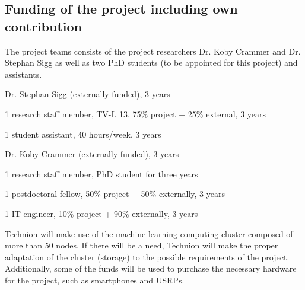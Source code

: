 \documentclass[12pt]{article}
\newcommand{\nolineskips}{
	\setlength{\parskip}{0pt}
	\setlength{\parsep}{0pt}
	\setlength{\topsep}{0pt}
	\setlength{\partopsep}{0pt}
	\setlength{\itemsep}{0pt}}
\begin{document}
\subsection*{Funding of the project including own contribution}
The project teams consists of the project researchers Dr. Koby Crammer and Dr. Stephan Sigg as well as two PhD students (to be appointed for this project) and assistants.
\begin{description}
	\nolineskips
	\item[UGOE] Dr. Stephan Sigg (externally funded), 3 years
	\item[UGOE] 1 research staff member, TV-L 13, 75\% project + 25\% external, 3 years
	\item[UGOE] 1 student assistant, 40 hours/week, 3 years
	\item[Technion] Dr. Koby Crammer (externally funded), 3 years 
	\item[Technion] 1 research staff member, PhD student for three years
	\item[Technion] 1 postdoctoral fellow, 50\% project + 50\% externally, 3 years
	\item[Technion] 1 IT engineer, 10\% project + 90\% externally, 3 years
\end{description}
Technion will make use of the machine learning computing cluster composed of more than 50 nodes. If there will be a need, Technion will make the proper adaptation of the cluster (storage) to the possible requirements of the project. Additionally, some of the funds will be used to purchase the necessary hardware for the project, such as smartphones and USRPs.


\pagebreak
\end{document}
